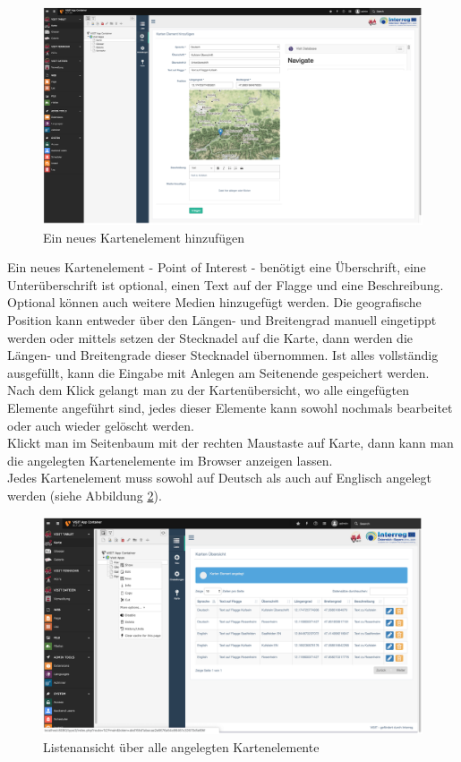 \begin{figure}[ht!]
\centering
\includegraphics[width=12cm]{Figures/paula/karte/neues_kartenelement_hinzufuegen.png}
\caption{Ein neues Kartenelement hinzufügen}
\label{img:neues_kartenelement_hinzufuegen}
\end{figure}

Ein neues Kartenelement - Point of Interest - benötigt eine Überschrift, eine Unterüberschrift ist optional, einen Text auf der Flagge und eine Beschreibung. Optional können auch weitere Medien hinzugefügt werden. Die geografische Position kann entweder über den Längen- und Breitengrad manuell eingetippt werden oder mittels setzen der Stecknadel auf die Karte, dann werden die Längen- und Breitengrade dieser Stecknadel übernommen. Ist alles vollständig ausgefüllt, kann die Eingabe mit \glqq Anlegen\grqq{} am Seitenende gespeichert werden. Nach dem Klick gelangt man zu der Kartenübersicht, wo alle eingefügten Elemente angeführt sind, jedes dieser Elemente kann sowohl nochmals bearbeitet oder auch wieder gelöscht werden.\\
Klickt man im Seitenbaum mit der rechten Maustaste auf Karte, dann kann man die angelegten Kartenelemente im Browser anzeigen lassen.\\
Jedes Kartenelement muss sowohl auf Deutsch als auch auf Englisch angelegt werden (siehe Abbildung \ref{img:listenuebersicht_kartenelemente}).

\begin{figure}[ht!]
\centering
\includegraphics[width=12cm]{Figures/paula/karte/listenuebersicht_kartenelemente.png}
\caption{Listenansicht über alle angelegten Kartenelemente}
\label{img:listenuebersicht_kartenelemente}
\end{figure}

